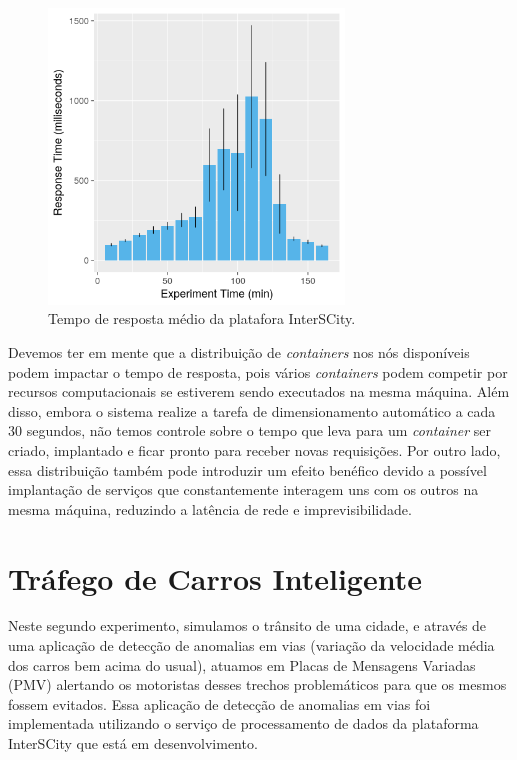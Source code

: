 \begin{figure}[ht]
	\centering
	\includegraphics[width=0.7\textwidth]{figuras/response_time_mean.png}
    \caption{Tempo de resposta médio da platafora InterSCity.}
	\label{fig:responsetime}
\end{figure}


Devemos ter em mente que a distribuição de \textit{containers} nos nós disponíveis podem impactar o tempo de resposta, pois vários \textit{containers} podem competir por recursos computacionais se estiverem
sendo executados na mesma máquina.
Além disso, embora o sistema realize a tarefa de dimensionamento automático a cada 30 segundos, não temos controle sobre o tempo que leva para um \textit{container} ser criado, implantado e ficar pronto
para receber novas requisições.
Por outro lado, essa distribuição também pode introduzir um efeito benéfico devido a possível implantação de serviços que constantemente interagem uns com os outros na mesma máquina, reduzindo a latência
de rede e imprevisibilidade.

\section{Tráfego de Carros Inteligente}

Neste segundo experimento, simulamos o trânsito de uma cidade, e através de uma aplicação de detecção de anomalias em vias (variação da velocidade média dos carros bem acima do usual),
atuamos em Placas de Mensagens Variadas (PMV) alertando os motoristas desses trechos problemáticos para que os mesmos fossem evitados.
Essa aplicação de detecção de anomalias em vias foi implementada utilizando o serviço de processamento de dados da plataforma InterSCity que está em desenvolvimento.

